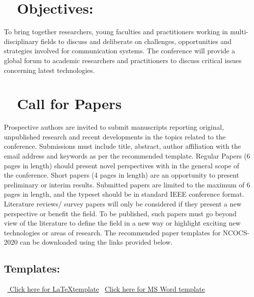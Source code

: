 \documentclass[12pt,a3paper, foldmark,notumble]{leaflet}
\begin{document}

\section{\faHandORight~   \textbf{Objectives:}}
To bring together researchers, young faculties and practitioners working in multi-disciplinary fields to discuss and deliberate on challenges, opportunities and strategies involved for communication systems. The conference will provide a global forum to academic researchers and practitioners to discuss critical issues concerning latest technologies.

\section{\faNewspaperO~  Call  for Papers}
Prospective authors are invited to submit manuscripts reporting original, unpublished research and recent developments in the topics related to the conference. Submissions must include title, abstract, author affiliation with the email address and keywords as per the recommended template. Regular Papers (6 pages in length) should present novel perspectives with in the general scope of the conference. Short papers (4 pages in length) are an opportunity to present preliminary or interim results. Submitted papers are limited to the maximum of 6 pages in length, and the typeset should be in standard IEEE conference format. Literature reviews/ survey papers will only be considered if they present a new perspective or benefit the field. To be published, such papers must go beyond view of the literature to define the field in a new way or highlight exciting new technologies or areas of research. The recommended paper templates for NCOCS-2020 can be downloaded using the links provided below.

\subsection{Templates:}
\faHandORight~\href{https://www.ieee.org/content/dam/ieee-org/ieee/web/org/conferences/Conference-LaTeX-template_7-9-18.zip}{ Click here for \LaTeX template} \hspace{0.75cm}
\faHandORight~\href{https://www.ieee.org/content/dam/ieee-org/ieee/web/org/conferences/conference-template-a4.docx}{Click here for MS Word template}
\end{document}
